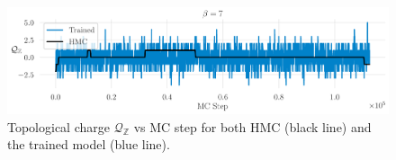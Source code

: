 \documentclass{article} %
\begin{document}
%
%
%
%
\begin{figure}[htpb]
   \centering
   \includegraphics[width=\textwidth]{figures/topological_freezing_anl_blue_wide.pdf}
   \caption{\label{fig:topfreeze}Topological charge \(\mathcal{Q}_{\mathbb{Z}}\) vs MC
   step for both HMC (black line) and the trained model (blue line).}%
\end{figure}
%
\end{document}
